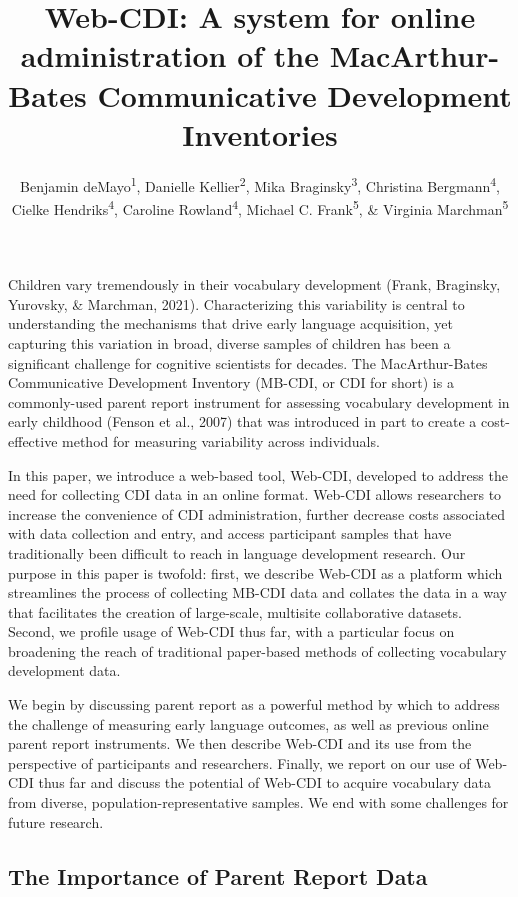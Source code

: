 \documentclass[
  english,
  man]{apa7}
\title{Web-CDI: A system for online administration of the MacArthur-Bates Communicative Development Inventories}
\author{Benjamin deMayo\textsuperscript{1}, Danielle Kellier\textsuperscript{2}, Mika Braginsky\textsuperscript{3}, Christina Bergmann\textsuperscript{4}, Cielke Hendriks\textsuperscript{4}, Caroline Rowland\textsuperscript{4}, Michael C. Frank\textsuperscript{5}, \& Virginia Marchman\textsuperscript{5}}
\date{}
\affiliation{\vspace{0.5cm}\textsuperscript{1} Princeton University\\\textsuperscript{2} University of Pennsylvania\\\textsuperscript{3} Massachussetts Institute of Technology\\\textsuperscript{4} Max Planck Institute for Psycholinguistics\\\textsuperscript{5} Stanford University}
\begin{document}
\maketitle

Children vary tremendously in their vocabulary development (Frank, Braginsky, Yurovsky, \& Marchman, 2021). Characterizing this variability is central to understanding the mechanisms that drive early language acquisition, yet capturing this variation in broad, diverse samples of children has been a significant challenge for cognitive scientists for decades. The MacArthur-Bates Communicative Development Inventory (MB-CDI, or CDI for short) is a commonly-used parent report instrument for assessing vocabulary development in early childhood (Fenson et al., 2007) that was introduced in part to create a cost-effective method for measuring variability across individuals.

In this paper, we introduce a web-based tool, Web-CDI, developed to address the need for collecting CDI data in an online format. Web-CDI allows researchers to increase the convenience of CDI administration, further decrease costs associated with data collection and entry, and access participant samples that have traditionally been difficult to reach in language development research. Our purpose in this paper is twofold: first, we describe Web-CDI as a platform which streamlines the process of collecting MB-CDI data and collates the data in a way that facilitates the creation of large-scale, multisite collaborative datasets. Second, we profile usage of Web-CDI thus far, with a particular focus on broadening the reach of traditional paper-based methods of collecting vocabulary development data.

We begin by discussing parent report as a powerful method by which to address the challenge of measuring early language outcomes, as well as previous online parent report instruments. We then describe Web-CDI and its use from the perspective of participants and researchers. Finally, we report on our use of Web-CDI thus far and discuss the potential of Web-CDI to acquire vocabulary data from diverse, population-representative samples. We end with some challenges for future research.

\hypertarget{the-importance-of-parent-report-data}{%
\subsection{The Importance of Parent Report Data}\label{the-importance-of-parent-report-data}}
\end{document}
